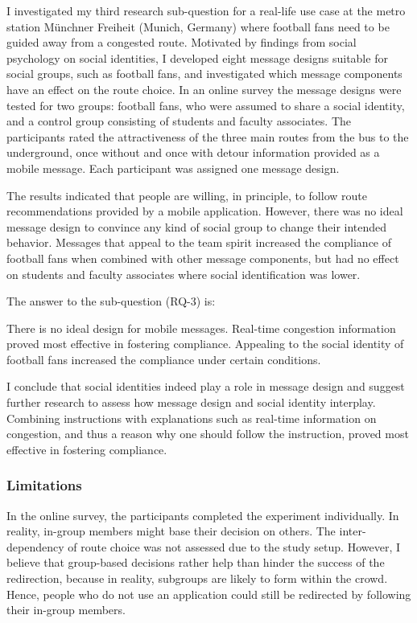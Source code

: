 I investigated my third research sub-question for a real-life use case at the metro station Münchner Freiheit (Munich, Germany) where football fans need to be guided away from a congested route. Motivated by findings from social psychology on social identities, I developed eight message designs suitable for social groups, such as football fans, and investigated which  message components have an effect on the route choice. In an online survey the message designs were tested for two groups: football fans, who were assumed to share a social identity, and a control group consisting of students and faculty associates. The participants rated the attractiveness of the three main routes from the bus to the underground, once without and once with detour information provided as a mobile message. Each participant was assigned one message design. 



The results indicated that people are willing, in principle, to follow route recommendations provided by a mobile application. However, there was no ideal message design to convince any kind of social group to change their intended behavior. 
Messages that appeal to the team spirit increased the compliance of football fans when combined with other message components,
but had no effect on students and faculty associates where social identification was lower. 

The answer to the sub-question (RQ-3) is:

\begin{tcolorbox}[title=How should mobile messages  be designed to improve the compliance of crowd members to follow route recommendations? (RQ-3)]
There is no ideal design for mobile messages. Real-time congestion information proved most effective in fostering compliance. Appealing to the social identity of football fans increased the compliance under certain conditions. 
\end{tcolorbox}


I conclude that social identities indeed play a role in message design and suggest further research to assess how message design and social identity interplay. Combining instructions with explanations such as real-time information on congestion, and thus a reason why one should follow the instruction, proved most effective in fostering compliance. 


\subsubsection{Limitations}
In the online survey, the participants completed the experiment individually. In reality, in-group
members might base their decision on others. The inter-dependency of route choice was not assessed due to the study setup. 
However, I believe that group-based decisions rather help than hinder the success of the redirection, because in
reality, subgroups are likely to form within the crowd. Hence, people who do not use an application could still be redirected by following their in-group members. 

